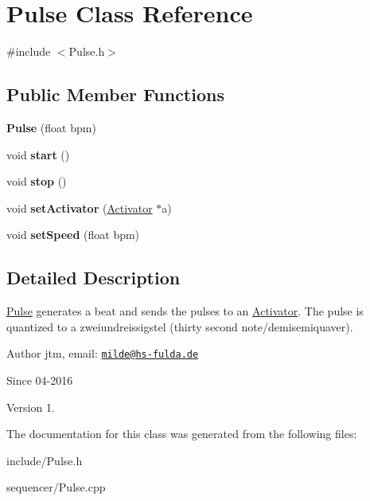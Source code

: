 \hypertarget{classPulse}{}\section{Pulse Class Reference}
\label{classPulse}


{\ttfamily \#include $<$Pulse.\+h$>$}

\subsection*{Public Member Functions}
\begin{DoxyCompactItemize}
\item 
{\bfseries Pulse} (float bpm)\hypertarget{classPulse_a9835b637db766732dd508c94fc30c501}{}\label{classPulse_a9835b637db766732dd508c94fc30c501}

\item 
void {\bfseries start} ()\hypertarget{classPulse_a164d81d4e1e798a5eec15b0b030b4047}{}\label{classPulse_a164d81d4e1e798a5eec15b0b030b4047}

\item 
void {\bfseries stop} ()\hypertarget{classPulse_a7c8121986bec5319bb097216fe5e93d0}{}\label{classPulse_a7c8121986bec5319bb097216fe5e93d0}

\item 
void {\bfseries set\+Activator} (\hyperlink{classActivator}{Activator} $\ast$a)\hypertarget{classPulse_a8283f4ab252e0c38b1e19a4dec522f23}{}\label{classPulse_a8283f4ab252e0c38b1e19a4dec522f23}

\item 
void {\bfseries set\+Speed} (float bpm)\hypertarget{classPulse_afc87b2e4120c47942cf03fc82aaf8002}{}\label{classPulse_afc87b2e4120c47942cf03fc82aaf8002}

\end{DoxyCompactItemize}


\subsection{Detailed Description}
\hyperlink{classPulse}{Pulse} generates a beat and sends the pulses to an \hyperlink{classActivator}{Activator}. The pulse is quantized to a zweiundreissigstel (thirty second note/demisemiquaver).

\begin{DoxyAuthor}{Author}
jtm, email\+:  \href{mailto:milde@hs-fulda.de}{\tt milde@hs-\/fulda.\+de} 
\end{DoxyAuthor}
\begin{DoxySince}{Since}
04-\/2016 
\end{DoxySince}
\begin{DoxyVersion}{Version}
1. 
\end{DoxyVersion}


The documentation for this class was generated from the following files\+:\begin{DoxyCompactItemize}
\item 
include/Pulse.\+h\item 
sequencer/Pulse.\+cpp\end{DoxyCompactItemize}
